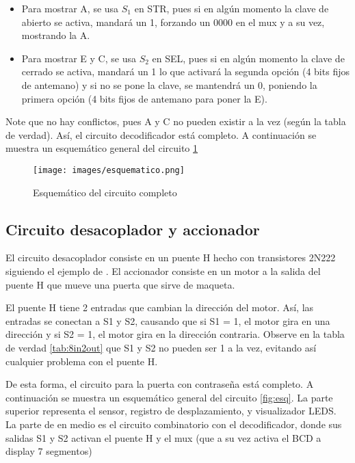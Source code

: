 \documentclass[12pt,a4paper]{article}
\begin{document}
\begin{itemize}
    \item Para mostrar A, se usa $S_1$ en STR, pues si en algún momento la clave de abierto se activa, mandará un 1, forzando un $0000$ en el mux y a su vez, mostrando la A.

    \item Para mostrar E y C, se usa $S_2$ en SEL, pues si en algún momento la clave de cerrado se activa, mandará un 1 lo que activará la segunda opción (4 bits fijos de antemano) y si no se pone la clave, se mantendrá un 0, poniendo la primera opción (4 bits fijos de antemano para poner la E).
    
\end{itemize}

Note que no hay conflictos, pues A y C no pueden existir a la vez (según la tabla de verdad). Así, el circuito decodificador está completo. A continuación se muestra un esquemático general del circuito \ref{fig:esq1}

\begin{figure}[h!] %
    \centering    
    \texttt{[image: images/esquematico.png]} %
    \caption{Esquemático del circuito completo}
    \label{fig:esq1}
\end{figure}

\subsection{Circuito desacoplador y accionador}

El circuito desacoplador consiste en un puente H hecho con transistores 2N222 siguiendo el ejemplo de \cite{makordoba2025circuitoH}. El accionador consiste en un motor a la salida del puente H que mueve una puerta que sirve de maqueta. 

El puente H tiene 2 entradas que cambian la dirección del motor. Así, las entradas se conectan a S1 y S2, causando que si S1 = 1, el motor gira en una dirección y si S2 = 1, el motor gira en la dirección contraria. Observe en la tabla de verdad \ref{tab:8in2out} que S1 y S2 no pueden ser 1 a la vez, evitando así cualquier problema con el puente H.

De esta forma, el circuito para la puerta con contraseña está completo. A continuación se muestra un esquemático general del circuito \ref{fig:esq}. La parte superior representa el sensor, registro de desplazamiento, y visualizador LEDS. La parte de en medio es el circuito combinatorio con el decodificador, donde sus salidas S1 y S2 activan el puente H y el mux (que a su vez activa el BCD a display 7 segmentos)
\end{document}
